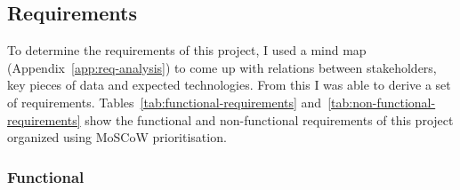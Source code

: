 
\subsection{Requirements}
\label{subsec:requirements}

To determine the requirements of this project, I used a mind map (Appendix~\ref{app:req-analysis}) to come up with relations between stakeholders, key pieces of data and expected technologies. From this I was able to derive a set of requirements.
\x
Tables~\ref{tab:functional-requirements} and~\ref{tab:non-functional-requirements} show the functional and non-functional requirements of this project organized using MoSCoW prioritisation.

\vspace{-4mm}
\subsubsection*{Functional}
\vspace{-4mm}
